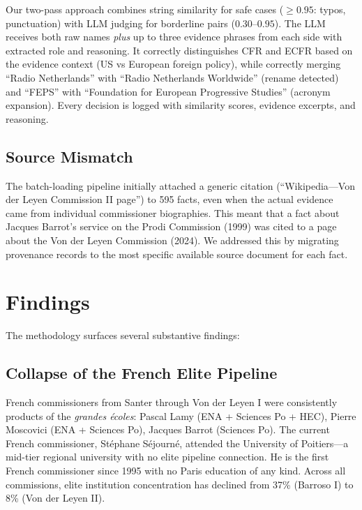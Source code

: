 \documentclass[11pt,a4paper]{article}
\begin{document}
Our two-pass approach combines string similarity for safe cases ($\geq 0.95$: typos, punctuation) with LLM judging for borderline pairs ($0.30$--$0.95$). The LLM receives both raw names \emph{plus} up to three evidence phrases from each side with extracted role and reasoning. It correctly distinguishes CFR and ECFR based on the evidence context (US vs European foreign policy), while correctly merging ``Radio Netherlands'' with ``Radio Netherlands Worldwide'' (rename detected) and ``FEPS'' with ``Foundation for European Progressive Studies'' (acronym expansion). Every decision is logged with similarity scores, evidence excerpts, and reasoning.

\subsection{Source Mismatch}

The batch-loading pipeline initially attached a generic citation (``Wikipedia---Von der Leyen Commission II page'') to 595 facts, even when the actual evidence came from individual commissioner biographies. This meant that a fact about Jacques Barrot's service on the Prodi Commission (1999) was cited to a page about the Von der Leyen Commission (2024). We addressed this by migrating provenance records to the most specific available source document for each fact.

\section{Findings}

The methodology surfaces several substantive findings:

\subsection{Collapse of the French Elite Pipeline}

French commissioners from Santer through Von der Leyen I were consistently products of the \emph{grandes \'ecoles}: Pascal Lamy (ENA + Sciences Po + HEC), Pierre Moscovici (ENA + Sciences Po), Jacques Barrot (Sciences Po). The current French commissioner, St\'ephane S\'ejourn\'e, attended the University of Poitiers---a mid-tier regional university with no elite pipeline connection. He is the first French commissioner since 1995 with no Paris education of any kind. Across all commissions, elite institution concentration has declined from 37\% (Barroso I) to 8\% (Von der Leyen II).
\end{document}
